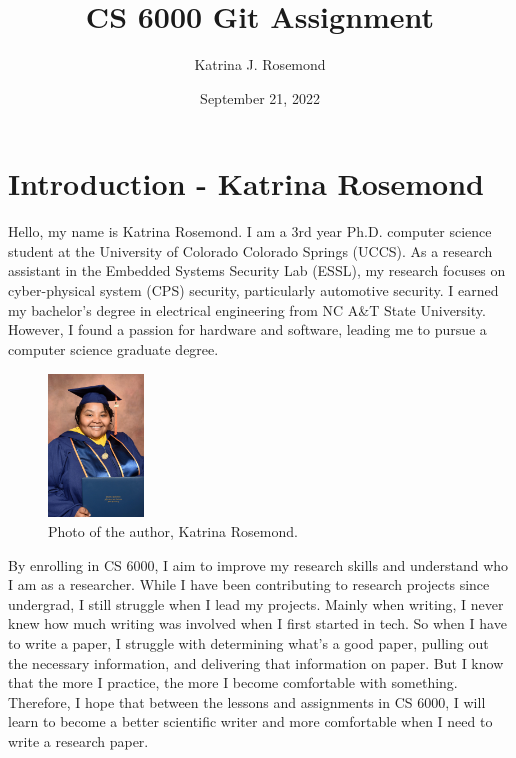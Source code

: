 \graphicspath{{./images/}}

\title{CS 6000 Git Assignment}

\author{Katrina J. Rosemond}
\date{September 21, 2022}

%


\section{Introduction - Katrina Rosemond}

Hello, my name is Katrina Rosemond. I am a 3rd year Ph.D. computer science 
student at the University of Colorado Colorado Springs (UCCS). As a 
research assistant in the Embedded Systems Security Lab (ESSL), my 
research focuses on cyber-physical system (CPS) security, particularly 
automotive security. I earned my bachelor's degree in electrical 
engineering from NC A\&T State University. However, I found a passion for 
hardware and software, leading me to pursue a computer science graduate 
degree. 

\begin{figure}[ht]
    \centering
    \includegraphics[width= 1in, height= 1.5in]{RosemondGrad.jpg}
    \caption{Photo of the author, Katrina Rosemond.}
\end{figure}

By enrolling in CS 6000, I aim to improve my research skills and 
understand who I am as a researcher. While I have been contributing to 
research projects since undergrad, I still struggle when I lead my 
projects. Mainly when writing, I never knew how much writing was involved 
when I first started in tech. So when I have to write a paper, I struggle 
with determining what's a good paper, pulling out the necessary 
information, and delivering that information on paper. But I know that the 
more I practice, the more I become comfortable with something. Therefore, 
I hope that between the lessons and assignments in CS 6000, I will learn 
to become a better scientific writer and more comfortable when I need to 
write a research paper.


